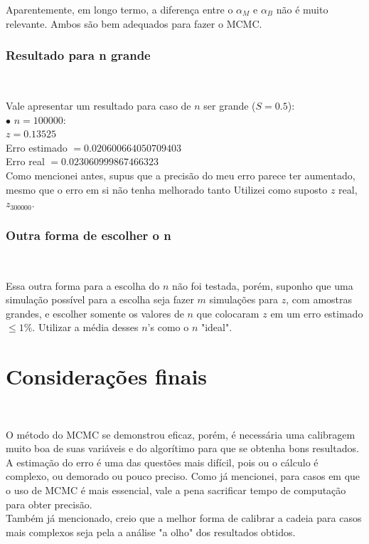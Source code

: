 \documentclass[pt12]{article}
\begin{document}
Aparentemente, em longo termo, a diferença entre o $\alpha_M$ e $\alpha_B$ não é muito relevante. Ambos são bem adequados para fazer o MCMC.\\

\subsubsection{Resultado para n grande}
\ 

Vale apresentar um resultado para caso de $n$ ser grande ($S = 0.5$):\\

\indent $\bullet$ $n = 100000$:\\

\indent \indent $z = 0.13525$\\
\indent \indent Erro estimado $= 0.020600664050709403$\\
\indent \indent Erro real $= 0.023060999867466323$\\

Como mencionei antes, supus que a precisão do meu erro parece ter aumentado, mesmo que o erro em si não tenha melhorado tanto Utilizei como suposto $z$ real, $z_{300000}$.\\

\subsubsection{Outra forma de escolher o n}
\

Essa outra forma para a escolha do $n$ não foi testada, porém, suponho que uma simulação possível para a escolha seja fazer $m$ simulações para $z$, com amostras grandes, e escolher somente os valores de $n$ que colocaram $z$ em um erro estimado $\leq 1\%$. Utilizar a média desses $n$'s como o $n$ "ideal".\\

\section{Considerações finais}
\ 

O método do MCMC se demonstrou eficaz, porém, é necessária uma calibragem muito boa de suas variáveis e do algorítimo para que se obtenha bons resultados. A estimação do erro é uma das questões mais difícil, pois ou o cálculo é complexo, ou demorado ou pouco preciso. Como já mencionei, para casos em que o uso de MCMC é mais essencial, vale a pena sacrificar tempo de computação para obter precisão.\\

Também já mencionado, creio que a melhor forma de calibrar a cadeia para casos mais complexos seja pela a análise "a olho" dos resultados obtidos.
\end{document}
